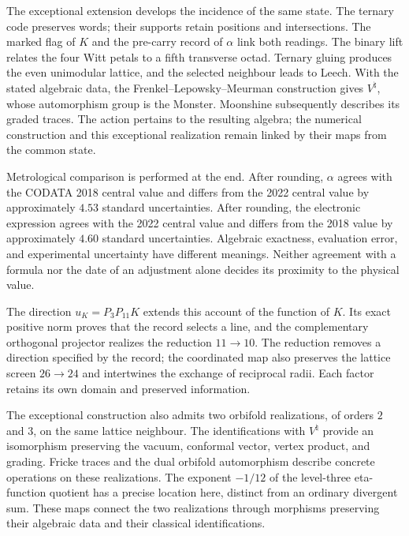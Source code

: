 The exceptional extension develops the incidence of the same state. The ternary code preserves words; their supports retain positions and intersections. The marked flag of \(K\) and the pre-carry record of \(\alpha\) link both readings. The binary lift relates the four Witt petals to a fifth transverse octad. Ternary gluing produces the even unimodular lattice, and the selected neighbour leads to Leech. With the stated algebraic data, the Frenkel--Lepowsky--Meurman construction gives \(V^\natural\), whose automorphism group is the Monster\cite{flm}. Moonshine subsequently describes its graded traces\cite{borcherds}. The action pertains to the resulting algebra; the numerical construction and this exceptional realization remain linked by their maps from the common state.

Metrological comparison is performed at the end\cite{codata2018,codata2022}. After rounding, \(\alpha\) agrees with the CODATA 2018 central value and differs from the 2022 central value by approximately \(4.53\) standard uncertainties. After rounding, the electronic expression agrees with the 2022 central value and differs from the 2018 value by approximately \(4.60\) standard uncertainties. Algebraic exactness, evaluation error, and experimental uncertainty have different meanings. Neither agreement with a formula nor the date of an adjustment alone decides its proximity to the physical value.



The direction \(u_K=P_3P_{11}K\) extends this account of the function
of \(K\). Its exact positive norm proves that the record selects
a line, and the complementary orthogonal projector realizes the reduction
\(11\to10\). The reduction removes a direction specified by the
record; the coordinated map also preserves the lattice screen
\(26\to24\) and intertwines the exchange of reciprocal radii. Each
factor retains its own domain and preserved information.

The exceptional construction also admits two orbifold
realizations, of orders \(2\) and \(3\), on the same lattice neighbour.
The identifications with \(V^\natural\) provide an isomorphism
preserving the vacuum, conformal vector, vertex product, and
grading. Fricke traces and the dual orbifold automorphism
describe concrete operations on these realizations. The exponent
\(-1/12\) of the level-three eta-function quotient has a precise
location here, distinct from an ordinary divergent sum.
These maps connect the two realizations through morphisms preserving
their algebraic data and their classical identifications.

